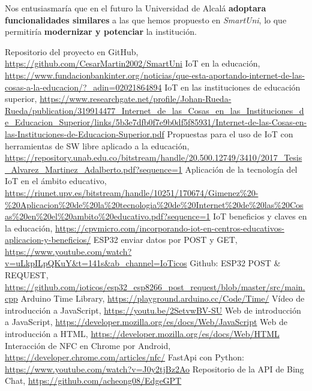 \documentclass[12pt]{report}
\begin{document}
Nos entusiasmaría que en el futuro la Universidad de Alcalá \textbf{adoptara funcionalidades similares} a las que hemos propuesto en \textit{SmartUni}, lo que permitiría \textbf{modernizar y potenciar} la institución.


\newpage
{}
{}
\begin{thebibliography}{8}
     Repositorio del proyecto en GitHub, \url{https://github.com/CesarMartin2002/SmartUni}
     IoT en la educación, \url{https://www.fundacionbankinter.org/noticias/que-esta-aportando-internet-de-las-cosas-a-la-educacion/?_adin=02021864894}
     IoT en las instituciones de educación superior, \url{https://www.researchgate.net/profile/Johan-Rueda-Rueda/publication/319914477_Internet_de_las_Cosas_en_las_Instituciones_de_Educacion_Superior/links/5b3e7dfb0f7e9b0df5f85931/Internet-de-las-Cosas-en-las-Instituciones-de-Educacion-Superior.pdf}
     Propuestas para el uso de IoT con herramientas de SW libre aplicado a la educación, \url{https://repository.unab.edu.co/bitstream/handle/20.500.12749/3410/2017_Tesis_Alvarez_Martinez_Adalberto.pdf?sequence=1}
     Aplicación de la tecnología del IoT en el ámbito educativo, \url{https://riunet.upv.es/bitstream/handle/10251/170674/Gimenez%20-%20Aplicacion%20de%20la%20tecnologia%20de%20Internet%20de%20las%20Cosas%20en%20el%20ambito%20educativo.pdf?sequence=1}
     IoT beneficios y claves en la educación,
    \url{https://cpvmicro.com/incorporando-iot-en-centros-educativos-aplicacion-y-beneficios/}
    ESP32 enviar datos por POST y GET, \url{https://www.youtube.com/watch?v=uLkpILpQKuY&t=141s&ab_channel=IoTicos}
        Github: ESP32 POST \& REQUEST, \url{https://github.com/ioticos/esp32_esp8266_post_request/blob/master/src/main.cpp}
     Arduino Time Library,     \url{https://playground.arduino.cc/Code/Time/}
     Vídeo de introducción a JavaScript, \url{https://youtu.be/2SetvwBV-SU}
     Web de introducción a JavaScript, \url{https://developer.mozilla.org/es/docs/Web/JavaScript}
     Web de introducción a HTML, \url{https://developer.mozilla.org/es/docs/Web/HTML}
     Interacción de NFC en Chrome por Android, \url{https://developer.chrome.com/articles/nfc/} 
     FastApi con Python:  \url{https://www.youtube.com/watch?v=J0y2tjBz2Ao}
    Repositorio de la API de Bing Chat,  \url{https://github.com/acheong08/EdgeGPT}
\end{thebibliography}
\newpage
\end{document}
